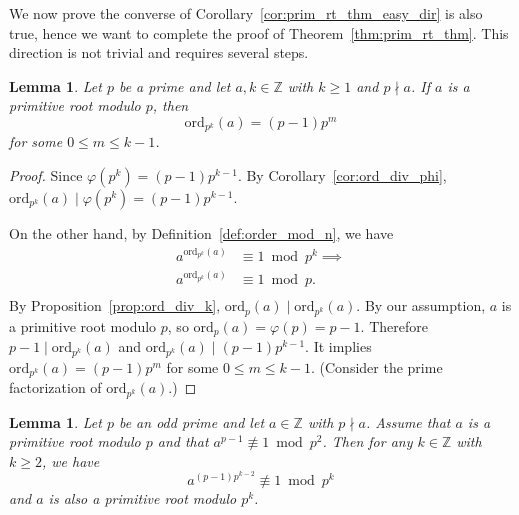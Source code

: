 \documentclass{amsbook}
\theoremstyle{plain}
\newtheorem{lemma}[theorem]{Lemma}
\theoremstyle{definition}
\theoremstyle{remark}
\numberwithin{equation}{chapter}
\numberwithin{figure}{chapter}
\newcommand{\Z}{\mathbb{Z}}
\newcommand*{\ord}{\text{ord}}
\begin{document}
We now prove the converse of Corollary~\ref{cor:prim_rt_thm_easy_dir} is also true, hence we want to complete the proof of Theorem~\ref{thm:prim_rt_thm}. This direction is not trivial and requires several steps.

\begin{lemma}\label{lem:lem1_day31}
  Let $p$ be a prime and let $a, k \in \Z$ with $k \geqslant 1$ and $p \nmid a$. If $a$ is a primitive root modulo $p$, then
  \[
    \ord_{p^k} (a) = (p - 1)p^m
  \]
  for some $0 \leqslant m \leqslant k - 1$.
\end{lemma}
\begin{proof}
  Since $\varphi (p^k) = (p - 1)p^{k-1}$. By Corollary~\ref{cor:ord_div_phi}, $\ord_{p^k} (a) \mid \varphi (p^k) = (p - 1)p^{k-1}$.

  On the other hand, by Definition~\ref{def:order_mod_n}, we have
  \begin{align}
    a^{\ord_{p^k} (a)} &\equiv 1 \bmod p^k  \implies \\
    a^{\ord_{p^k} (a)} &\equiv 1 \bmod p. \\
  \end{align}
  By Proposition~\ref{prop:ord_div_k}, $\ord_p (a) \mid \ord_{p^k} (a)$. By our assumption, $a$ is a primitive root modulo $p$, so $\ord_p (a) = \varphi (p) = p - 1$. Therefore $p - 1 \mid \ord_{p^k} (a)$ and $\ord_{p^k} (a) \mid (p - 1)p^{k-1}$. It implies $\ord_{p^k} (a) = (p - 1)p^m$ for some $0 \leqslant m \leqslant k - 1$. (Consider the prime factorization of $\ord_{p^k} (a)$.)
\end{proof}
\begin{lemma}\label{lem:lem2_day31}
  Let $p$ be an odd prime and let $a \in \Z$ with $p \nmid a$. Assume that $a$ is a primitive root modulo $p$ and that $a^{p-1} \not\equiv 1 \bmod p^2$. Then for any $k \in \Z$ with $k \geqslant 2$, we have
  \[
    a^{(p-1)p^{k-2}} \not\equiv 1 \bmod p^k
  \]
  and $a$ is also a primitive root modulo $p^k$.
\end{lemma}
\end{document}
